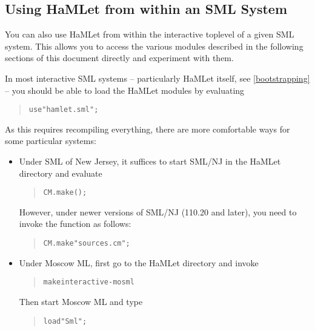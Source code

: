\documentclass[twoside,titlepage]{article}
\begin{document}
\subsection{Using HaMLet from within an SML System}
\label{usingembedded}

You can also use HaMLet from within the interactive toplevel of a given SML system. This allows you to access the various modules described in the following sections of this document directly and experiment with them.

In most interactive SML systems -- particularly HaMLet itself, see \ref{bootstrapping} -- you should be able to load the HaMLet modules by evaluating

\begin{quote}
\begin{alltt}
use "hamlet.sml";
\end{alltt}
\end{quote}

As this requires recompiling everything, there are more comfortable ways for some particular systems:

\begin{itemize}

\item Under SML of New Jersey, it suffices to start SML/NJ in the HaMLet directory and evaluate

\begin{quote}
\begin{alltt}
CM.make();
\end{alltt}
\end{quote}

However, under newer versions of SML/NJ (110.20 and later), you need to invoke the function as follows:

\begin{quote}
\begin{alltt}
CM.make "sources.cm";
\end{alltt}
\end{quote}

\item Under Moscow ML, first go to the HaMLet directory and invoke

\begin{quote}
\begin{alltt}
make interactive-mosml
\end{alltt}
\end{quote}

Then start Moscow ML and type

\begin{quote}
\begin{alltt}
load "Sml";
\end{alltt}
\end{quote}

\end{itemize}
\end{document}
